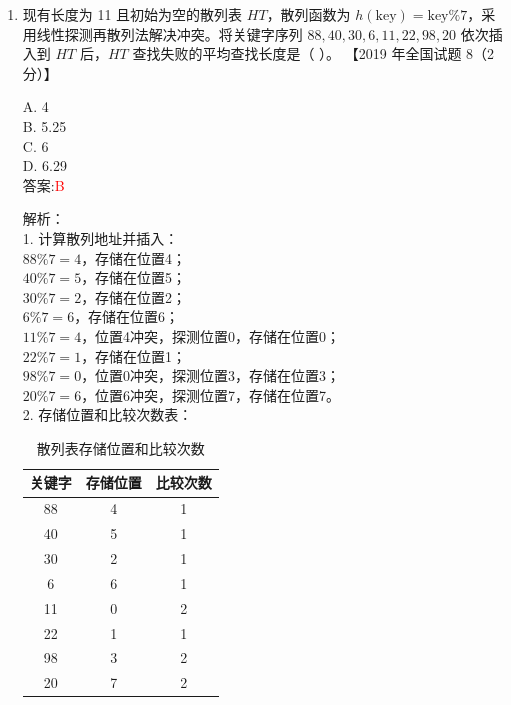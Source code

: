 \documentclass[lang=cn,newtx,10pt,scheme=chinese]{../../../elegantbook}
\begin{document}
\begin{enumerate}
\item 现有长度为 11 且初始为空的散列表 $HT$，散列函数为 $h(\text{key}) = \text{key} \% 7$，采用线性探测再散列法解决冲突。将关键字序列 $88, 40, 30, 6, 11, 22, 98, 20$ 依次插入到 $HT$ 后，$HT$ 查找失败的平均查找长度是（ ）。  
    【2019 年全国试题 8（2 分）】  

    A. 4 \\  
    B. 5.25 \\  
    C. 6 \\  
    D. 6.29 \\  

    答案:\textcolor{red}{B}

    解析：\\
    1. 计算散列地址并插入：\\
        $88 \% 7 = 4$，存储在位置4；\\
        $40 \% 7 = 5$，存储在位置5；\\
        $30 \% 7 = 2$，存储在位置2；\\
        $6 \% 7 = 6$，存储在位置6；\\
        $11 \% 7 = 4$，位置4冲突，探测位置0，存储在位置0；\\
        $22 \% 7 = 1$，存储在位置1；\\
        $98 \% 7 = 0$，位置0冲突，探测位置3，存储在位置3；\\
        $20 \% 7 = 6$，位置6冲突，探测位置7，存储在位置7。\\

    2. 存储位置和比较次数表：\\
    \begin{table}[h!]
        \centering
        \begin{tabular}{|c|c|c|}
            \hline
            关键字 & 存储位置 & 比较次数 \\ \hline
            88     & 4       & 1       \\ \hline
            40     & 5       & 1       \\ \hline
            30     & 2       & 1       \\ \hline
            6      & 6       & 1       \\ \hline
            11     & 0       & 2       \\ \hline
            22     & 1       & 1       \\ \hline
            98     & 3       & 2       \\ \hline
            20     & 7       & 2       \\ \hline
        \end{tabular}
        \caption{散列表存储位置和比较次数}
    \end{table} \\


\end{enumerate}
\end{document}

